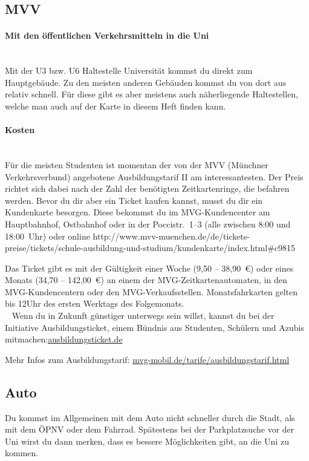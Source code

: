 
\clearpage

\subsection{MVV}

\paragraph{Mit den öffentlichen Verkehrsmitteln in die Uni}\hfill\\
Mit der U3 bzw. U6 Haltestelle Universität kommst du direkt zum Hauptgebäude. Zu den meisten anderen Gebäuden kommst du von dort aus relativ schnell. Für diese gibt es aber meistens auch näherliegende Haltestellen, welche man auch auf der Karte in diesem Heft finden kann.

\paragraph{Kosten}\hfill\\
Für die meisten Studenten ist momentan der von der MVV (Münchner Verkehrsverbund) angebotene Ausbildungstarif II am interessantesten. Der Preis richtet sich dabei nach der Zahl der benötigten Zeitkartenringe, die befahren werden. Bevor du dir aber ein Ticket kaufen kannst, musst du dir ein Kundenkarte besorgen. Diese bekommst du im MVG-Kundencenter am Hauptbahnhof, Ostbahnhof oder in der Poccistr.~1--3 (alle zwischen 8:00 und 18:00~Uhr) oder online \newline http://www.mvv-muenchen.de/de/tickets-preise/tickets/schule-ausbildung-und-studium/\newline kundenkarte/index.html\#c9815

Das Ticket gibt es mit der Gültigkeit einer Woche (9,50 -- 38,90~€) oder eines Monats (34,70 -- 142,00~€) an einem der MVG-Zeitkartenautomaten, in den MVG-Kundencentern oder den MVG-Verkaufsstellen. Monatsfahrkarten gelten bis 12Uhr des ersten Werktags des Folgemonats.\\
~
Wenn du in Zukunft günstiger unterwegs sein willst, kannst du bei der Initiative Ausbildungsticket, einem Bündnis aus Studenten, Schülern und Azubis mitmachen:\newline \url{ausbildungsticket.de}

Mehr Infos zum Ausbildungstarif: \url{mvg-mobil.de/tarife/ausbildungstarif.html}


\subsection{Auto}
Du kommst im Allgemeinen mit dem Auto nicht schneller durch die Stadt, als mit dem ÖPNV oder dem Fahrrad. Spätestens bei der Parkplatzsuche vor der Uni wirst du dann merken, dass es bessere Möglichkeiten gibt, an die Uni zu kommen.

